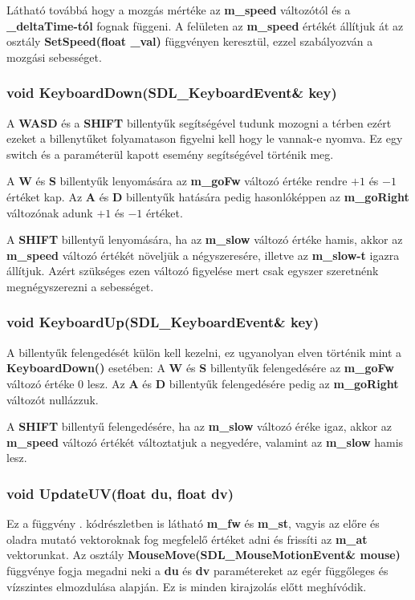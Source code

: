 Látható továbbá hogy a mozgás mértéke az \textbf{m\_speed} változótól és a \textbf{\_deltaTime-tól} fognak függeni. A felületen az \textbf{m\_speed} értékét állítjuk át az osztály \textbf{SetSpeed(float \_val)} függvényen keresztül, ezzel szabályozván a mozgási sebességet.


\subsubsection{void KeyboardDown(SDL\_KeyboardEvent\& key) }

A \textbf{WASD} és a \textbf{SHIFT} billentyűk segítségével tudunk mozogni a térben ezért ezeket a billenytűket folyamatason figyelni kell hogy le vannak-e nyomva. Ez egy switch és a paraméterül kapott esemény segítségével történik meg.

A \textbf{W} és \textbf{S} billentyűk lenyomására az \textbf{m\_goFw} változó értéke rendre $+1$ és $-1$ értéket kap. Az \textbf{A} és \textbf{D} billentyűk hatására pedig hasonlóképpen az \textbf{m\_goRight} változónak adunk $+1$ és $-1$ értéket.

A \textbf{SHIFT} billentyű lenyomására, ha az \textbf{m\_slow} változó értéke hamis, akkor az \textbf{m\_speed} változó értékét növeljük a négyszeresére, illetve az \textbf{m\_slow-t} igazra állítjuk. Azért szükséges ezen változó figyelése mert csak egyszer szeretnénk megnégyszerezni a sebességet. 

\subsubsection{void KeyboardUp(SDL\_KeyboardEvent\& key) }

A billentyűk felengedését külön kell kezelni, ez ugyanolyan elven történik mint a \textbf{KeyboardDown()} esetében: A \textbf{W} és \textbf{S} billentyűk felengedésére az \textbf{m\_goFw} változó értéke 0 lesz. Az \textbf{A} és \textbf{D} billentyűk felengedésére pedig az \textbf{m\_goRight} változót nullázzuk.

A \textbf{SHIFT} billentyű felengedésére, ha az \textbf{m\_slow} változó éréke igaz, akkor az \textbf{m\_speed} változó értékét változtatjuk a negyedére, valamint az \textbf{m\_slow} hamis lesz.

\subsubsection{void UpdateUV(float du, float dv)}

Ez a függvény . kódrészletben is látható \textbf{m\_fw} és \textbf{m\_st}, vagyis az előre és oladra mutató vektoroknak fog megfelelő értéket adni és frissíti az \textbf{m\_at} vektorunkat. Az osztály \textbf{MouseMove(SDL\_MouseMotionEvent\& mouse)} függvénye fogja megadni neki a \textbf{du} és \textbf{dv} paramétereket az egér függőleges és vízszintes elmozdulása alapján. Ez is minden kirajzolás előtt meghívódik.

